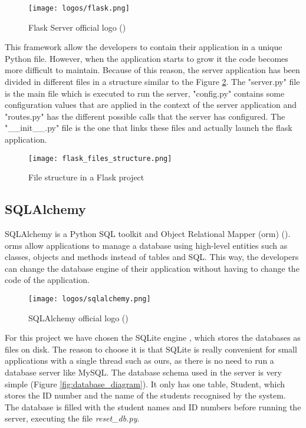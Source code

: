 	\begin{figure}[!ht]
		\centering
		\texttt{[image: logos/flask.png]}
		\caption{Flask Server official logo (\cite{flask_server_docs})}
		\label{fig:flask_server}
	\end{figure}	

	This framework allow the developers to contain their application in a unique Python file. However, when the application starts to grow it the code becomes more difficult to maintain. Because of this reason, the server application has been divided in different files in a structure similar to the Figure \ref{fig:flask_files_struct}. The "server.py" file is the main file which is executed to run the server, "config.py" contains some configuration values that are applied in the context of the server application and "routes.py" has the different possible calls that the server has configured. The "{\_}{\_}init{\_}{\_}.py" file is the one that links these files and actually launch the flask application.

	\begin{figure}[!ht]
		\centering
		\texttt{[image: flask\_files\_structure.png]}
		\caption{File structure in a Flask project}
		\label{fig:flask_files_struct}
	\end{figure}		

	\subsection{SQLAlchemy}
	\label{subsec:sql_alchemy}
	SQLAlchemy is a Python SQL toolkit and Object Relational Mapper (\gls{orm}) (\cite{sqlalchemy_main_website}). \glspl{orm} allow applications to manage a database using high-level entities such as classes, objects and methods instead of tables and SQL. This way, the developers can change the database engine of their application without having to change the code of the application. 

	\begin{figure}[!ht]
		\centering
		\texttt{[image: logos/sqlalchemy.png]}
		\caption{SQLAlchemy official logo (\cite{sqlalchemy_main_website})}
		\label{fig:sqlalchemy}
	\end{figure}

	For this project we have chosen the SQLite engine , which stores the databases as files on disk. The reason to choose it is that SQLite is really convenient for small applications with a single thread such as ours, as there is no need to run a database server like MySQL. The database schema used in the server is very simple (Figure \ref{fig:database_diagram}). It only has one table, Student, which stores the ID number and the name of the students recognised by the system. The database is filled with the student names and ID numbers before running the server, executing the file \textit{reset{\_}db.py}.

